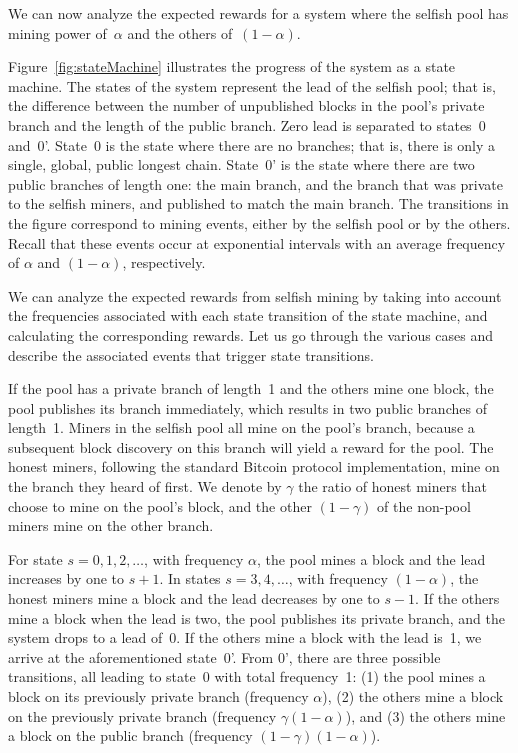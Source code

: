 \documentclass[letterpaper]{llncs}
\begin{document}
We can now analyze the expected rewards for a system where the selfish pool has mining power of~$\alpha$ and the others of~$(1-\alpha)$. 

Figure~\ref{fig:stateMachine} illustrates the progress of the system as a state machine. The states of the system represent the lead of the selfish pool; that is, the difference between the number of unpublished blocks in the pool's private branch and the length of the public branch. Zero lead is separated to states~0 and~0'. State~0 is the state where there are no branches; that is, there is only a single, global, public longest chain. State~0' is the state where there are two public branches of length one: the main branch, and the branch that was private to the selfish miners, and published to match the main branch. The transitions in the figure correspond to mining events, either by the selfish pool or by the others. Recall that these events occur at exponential intervals with an average frequency of $\alpha$ and $(1-\alpha)$, respectively. 

We can analyze the expected rewards from selfish mining by taking into account the frequencies associated with each state transition of the state machine, and calculating the corresponding rewards. Let us go through the various cases and describe the associated events that trigger state transitions. 

If the pool has a private branch of length~1 and the others mine one block, the pool publishes its branch immediately, which results in two public branches of length~1. Miners in the selfish pool all mine on the pool's branch, because a subsequent block discovery on this branch will yield a reward for the pool. The honest miners, following the standard Bitcoin protocol implementation, mine on the branch they heard of first. We denote by $\gamma$ the ratio of honest miners that choose to mine on the pool's block, and the other $(1-\gamma)$ of the non-pool miners mine on the other branch. 

For state $s = 0, 1, 2, \dots$, with frequency $\alpha$, the pool mines a block and the lead increases by one to $s+1$. In states $s = 3, 4, \dots$, with frequency $(1 - \alpha)$, the honest miners mine a block and the lead decreases by one to $s-1$. 
If the others mine a block when the lead is two, the pool publishes its private branch, and the system drops to a lead of~0. 
If the others mine a block with the lead is~1, we arrive at the aforementioned state~0'. From 0', there are three possible transitions, all leading to state~0 with total frequency~1: (1) the pool mines a block on its previously private branch (frequency $\alpha$), (2) the others mine a block on the previously private branch (frequency $\gamma(1-\alpha)$), and (3) the others mine a block on the public branch (frequency $(1-\gamma)(1-\alpha)$). 
\end{document}

